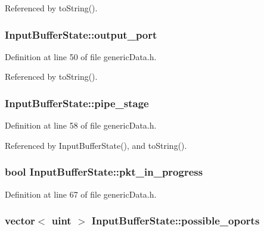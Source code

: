 Referenced by toString().
\subsubsection[{output\_\-port}]{ {\bf InputBufferState::output\_\-port}}\label{classInputBufferState_d777892abe1a0519ef54bac46eb0a773}




Definition at line 50 of file genericData.h.

Referenced by toString().
\subsubsection[{pipe\_\-stage}]{ {\bf InputBufferState::pipe\_\-stage}}\label{classInputBufferState_19cf3d0b896a34d27bdd8b53dbbe95fa}




Definition at line 58 of file genericData.h.

Referenced by InputBufferState(), and toString().
\subsubsection[{pkt\_\-in\_\-progress}]{\setlength{\rightskip}{0pt plus 5cm}bool {\bf InputBufferState::pkt\_\-in\_\-progress}}\label{classInputBufferState_d16e971c4c874929494e78eadeb6bd65}




Definition at line 67 of file genericData.h.
\subsubsection[{possible\_\-oports}]{\setlength{\rightskip}{0pt plus 5cm}vector$<$ {\bf uint} $>$ {\bf InputBufferState::possible\_\-oports}}\label{classInputBufferState_430fcf2f19b4ab7990a51d09433bc75a}




